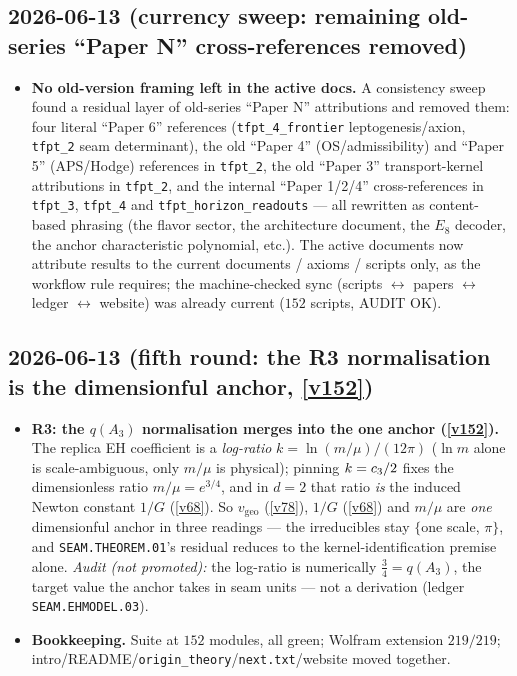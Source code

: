 \subsection*{2026-06-13 (currency sweep: remaining old-series ``Paper N'' cross-references removed)}
\begin{itemize}
\item \textbf{No old-version framing left in the active docs.} A consistency sweep
  found a residual layer of old-series ``Paper N'' attributions and removed them: four
  literal ``Paper 6'' references (\texttt{tfpt\_4\_frontier} leptogenesis/axion,
  \texttt{tfpt\_2} seam determinant), the old ``Paper 4'' (OS/admissibility) and
  ``Paper 5'' (APS/Hodge) references in \texttt{tfpt\_2}, the old ``Paper 3''
  transport-kernel attributions in \texttt{tfpt\_2}, and the internal ``Paper 1/2/4''
  cross-references in \texttt{tfpt\_3}, \texttt{tfpt\_4} and
  \texttt{tfpt\_horizon\_readouts} --- all rewritten as content-based phrasing (the
  flavor sector, the architecture document, the $E_8$ decoder, the anchor characteristic
  polynomial, etc.). The active documents now attribute results to the current
  documents / axioms / scripts only, as the workflow rule requires; the machine-checked
  sync (scripts $\leftrightarrow$ papers $\leftrightarrow$ ledger $\leftrightarrow$
  website) was already current ($152$ scripts, AUDIT OK).
\end{itemize}

\subsection*{2026-06-13 (fifth round: the R3 normalisation is the dimensionful anchor, \vref{v152})}
\begin{itemize}
\item \textbf{R3: the $q(A_3)$ normalisation merges into the one anchor (\vref{v152}).} The
  replica EH coefficient is a \emph{log-ratio} $k=\ln(m/\mu)/(12\pi)$ ($\ln m$ alone is
  scale-ambiguous, only $m/\mu$ is physical); pinning $k=c_3/2$ fixes the
  dimensionless ratio $m/\mu=e^{3/4}$, and in $d{=}2$ that ratio \emph{is} the induced
  Newton constant $1/G$ (\vref{v68}). So $v_{\mathrm{geo}}$ (\vref{v78}), $1/G$
  (\vref{v68}) and $m/\mu$ are \emph{one} dimensionful anchor in three readings --- the
  irreducibles stay $\{$one scale, $\pi\}$, and \texttt{SEAM.THEOREM.01}'s residual
  reduces to the kernel-identification premise alone. \emph{Audit (not promoted):} the
  log-ratio is numerically $\tfrac34=q(A_3)$, the target value the anchor takes in seam
  units --- not a derivation (ledger \texttt{SEAM.EHMODEL.03}).
\item \textbf{Bookkeeping.} Suite at $152$ modules, all green; Wolfram extension
  $219/219$; intro/README/\texttt{origin\_theory}/\texttt{next.txt}/website moved together.
\end{itemize}

